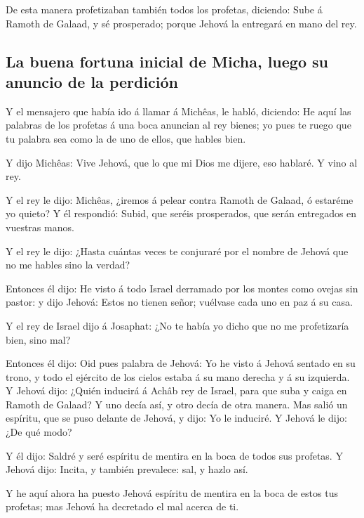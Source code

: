  De esta manera profetizaban también todos los profetas,
diciendo: Sube á Ramoth de Galaad, y sé prosperado; porque Jehová la
entregará en mano del rey.

\hypertarget{la-buena-fortuna-inicial-de-micha-luego-su-anuncio-de-la-perdiciuxf3n}{%
\subsection{La buena fortuna inicial de Micha, luego su anuncio de la
perdición}\label{la-buena-fortuna-inicial-de-micha-luego-su-anuncio-de-la-perdiciuxf3n}}

 Y el mensajero que había ido á llamar á Michêas, le habló,
diciendo: He aquí las palabras de los profetas á una boca anuncian al
rey bienes; yo pues te ruego que tu palabra sea como la de uno de ellos,
que hables bien.

 Y dijo Michêas: Vive Jehová, que lo que mi Dios me dijere,
eso hablaré. Y vino al rey.

 Y el rey le dijo: Michêas, ¿iremos á pelear contra Ramoth
de Galaad, ó estaréme yo quieto? Y él respondió: Subid, que seréis
prosperados, que serán entregados en vuestras manos.

 Y el rey le dijo: ¿Hasta cuántas veces te conjuraré por el
nombre de Jehová que no me hables sino la verdad?

 Entonces él dijo: He visto á todo Israel derramado por los
montes como ovejas sin pastor: y dijo Jehová: Estos no tienen señor;
vuélvase cada uno en paz á su casa.

 Y el rey de Israel dijo á Josaphat: ¿No te había yo dicho
que no me profetizaría bien, sino mal?

 Entonces él dijo: Oid pues palabra de Jehová: Yo he visto
á Jehová sentado en su trono, y todo el ejército de los cielos estaba á
su mano derecha y á su izquierda.  Y Jehová dijo: ¿Quién
inducirá á Achâb rey de Israel, para que suba y caiga en Ramoth de
Galaad? Y uno decía así, y otro decía de otra manera.  Mas
salió un espíritu, que se puso delante de Jehová, y dijo: Yo le
induciré. Y Jehová le dijo: ¿De qué modo?

 Y él dijo: Saldré y seré espíritu de mentira en la boca de
todos sus profetas. Y Jehová dijo: Incita, y también prevalece: sal, y
hazlo así.

 Y he aquí ahora ha puesto Jehová espíritu de mentira en la
boca de estos tus profetas; mas Jehová ha decretado el mal acerca de ti.


